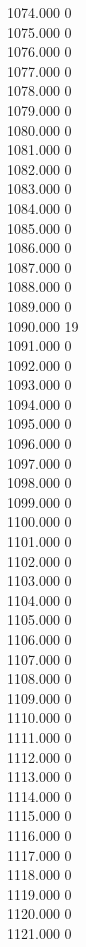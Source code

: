 { 1074.000	0 \\
 1075.000	0 \\
 1076.000	0 \\
 1077.000	0 \\
 1078.000	0 \\
 1079.000	0 \\
 1080.000	0 \\
 1081.000	0 \\
 1082.000	0 \\
 1083.000	0 \\
 1084.000	0 \\
 1085.000	0 \\
 1086.000	0 \\
 1087.000	0 \\
 1088.000	0 \\
 1089.000	0 \\
 1090.000	19 \\
 1091.000	0 \\
 1092.000	0 \\
 1093.000	0 \\
 1094.000	0 \\
 1095.000	0 \\
 1096.000	0 \\
 1097.000	0 \\
 1098.000	0 \\
 1099.000	0 \\
 1100.000	0 \\
 1101.000	0 \\
 1102.000	0 \\
 1103.000	0 \\
 1104.000	0 \\
 1105.000	0 \\
 1106.000	0 \\
 1107.000	0 \\
 1108.000	0 \\
 1109.000	0 \\
 1110.000	0 \\
 1111.000	0 \\
 1112.000	0 \\
 1113.000	0 \\
 1114.000	0 \\
 1115.000	0 \\
 1116.000	0 \\
 1117.000	0 \\
 1118.000	0 \\
 1119.000	0 \\
 1120.000	0 \\
 1121.000	0 \\
}
